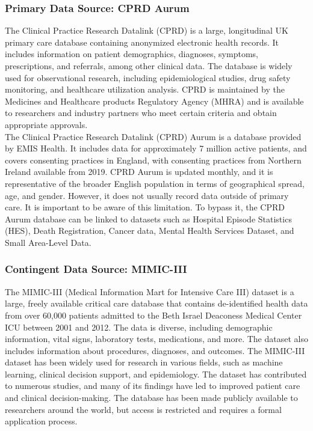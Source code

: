 \documentclass[%
 reprint,
 amsmath,amssymb,
 aps,
 nofootinbib,
]{revtex4-2}
\theoremstyle{definition}
\begin{document}
\subsubsection{\label{cprd} Primary Data Source: CPRD Aurum}
The Clinical Practice Research Datalink (CPRD) is a large, longitudinal UK primary care database containing anonymized electronic health records. It includes information on patient demographics, diagnoses, symptoms, prescriptions, and referrals, among other clinical data. The database is widely used for observational research, including epidemiological studies, drug safety monitoring, and healthcare utilization analysis. CPRD is maintained by the Medicines and Healthcare products Regulatory Agency (MHRA) and is available to researchers and industry partners who meet certain criteria and obtain appropriate approvals.\\

The Clinical Practice Research Datalink (CPRD) Aurum is a database provided by EMIS Health. It includes data for approximately 7 million active patients, and covers consenting practices in England, with consenting practices from Northern Ireland available from 2019. CPRD Aurum is updated monthly, and it is representative of the broader English population in terms of geographical spread, age, and gender. However, it does not usually record data outside of primary care. It is important to be aware of this limitation. To bypass it, the CPRD Aurum database can be linked to datasets such as Hospital Episode Statistics (HES), Death Registration, Cancer data, Mental Health Services Dataset, and Small Area-Level Data.

\subsubsection{\label{mimiciii} Contingent Data Source: MIMIC-III}

The MIMIC-III (Medical Information Mart for Intensive Care III) dataset is a large, freely available critical care database that contains de-identified health data from over 60,000 patients admitted to the Beth Israel Deaconess Medical Center ICU between 2001 and 2012. The data is diverse, including demographic information, vital signs, laboratory tests, medications, and more. The dataset also includes information about procedures, diagnoses, and outcomes. The MIMIC-III dataset has been widely used for research in various fields, such as machine learning, clinical decision support, and epidemiology. The dataset has contributed to numerous studies, and many of its findings have led to improved patient care and clinical decision-making. The database has been made publicly available to researchers around the world, but access is restricted and requires a formal application process.
\end{document}
